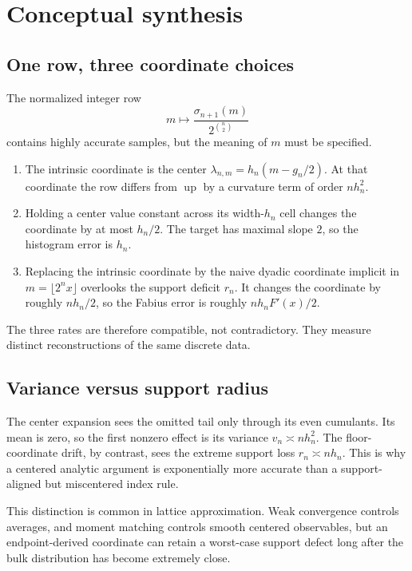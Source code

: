 \documentclass[11pt,oneside]{article}
\theoremstyle{definition}
\theoremstyle{remark}
\newcommand{\Up}{\operatorname{up}}
\begin{document}
\section{Conceptual synthesis}
\label{tmrates:sec:synthesis}

\subsection{One row, three coordinate choices}

The normalized integer row
\begin{equation}
 m\longmapsto\frac{\sigma_{n+1}(m)}{2^{\binom n2}}        \label{tmrates:eq:one-row}
\end{equation}
contains highly accurate samples, but the meaning of $m$ must be specified.

\begin{enumerate}
\item The intrinsic coordinate is the center
$\lambda_{n,m}=h_n(m-g_n/2)$.  At that coordinate the row differs from $\Up$ by a curvature
term of order $nh_n^2$.
\item Holding a center value constant across its width-$h_n$ cell changes the coordinate by
at most $h_n/2$.  The target has maximal slope $2$, so the histogram error is $h_n$.
\item Replacing the intrinsic coordinate by the naive dyadic coordinate implicit in
$m=\lfloor2^nx\rfloor$ overlooks the support deficit $r_n$.  It changes the coordinate by
roughly $nh_n/2$, so the Fabius error is roughly $nh_nF'(x)/2$.
\end{enumerate}
The three rates are therefore compatible, not contradictory.  They measure distinct
reconstructions of the same discrete data.

\subsection{Variance versus support radius}

The center expansion sees the omitted tail only through its even cumulants.  Its mean is zero,
so the first nonzero effect is its variance $v_n\asymp nh_n^2$.  The floor-coordinate drift,
by contrast, sees the extreme support loss $r_n\asymp nh_n$.  This is why a centered analytic
argument is exponentially more accurate than a support-aligned but miscentered index rule.

This distinction is common in lattice approximation.  Weak convergence controls averages,
and moment matching controls smooth centered observables, but an endpoint-derived coordinate
can retain a worst-case support defect long after the bulk distribution has become extremely
close.
\end{document}
